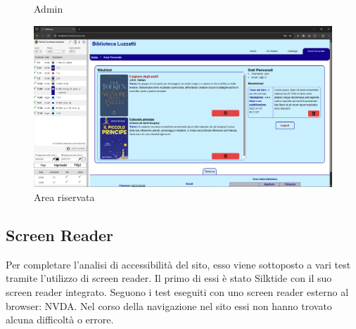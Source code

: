 \documentclass{article}
\begin{document}
\begin{figure}[H]
\begin{minipage}[t]{0.5\textwidth}
        \caption{Admin}
    \end{minipage}
    \hfill
    \begin{minipage}[t]{0.5\textwidth}
        \centering
        \includegraphics[width=\textwidth]{./img/area_riservata.png}
        \caption{Area riservata}
    \end{minipage}
\end{figure}


\subsection{Screen Reader}
Per completare l'analisi di accessibilità del sito, esso viene sottoposto a vari test tramite l'utilizzo di screen reader. Il primo di essi è stato Silktide con il suo screen reader integrato. Seguono i test eseguiti con uno screen reader esterno al browser: NVDA. Nel corso della navigazione nel sito essi non hanno trovato alcuna difficoltà o errore.
\end{document}
